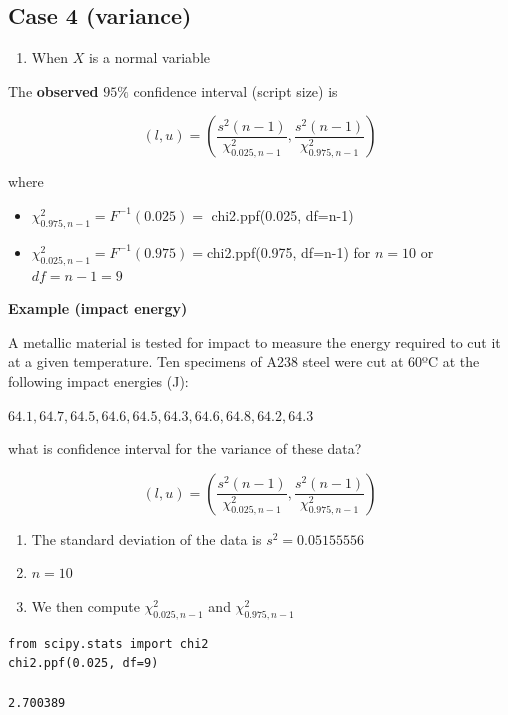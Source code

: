 \documentclass[
]{book}
\providecommand{\tightlist}{%
  \setlength{\itemsep}{0pt}\setlength{\parskip}{0pt}}
\begin{document}
\hypertarget{case-4-variance}{%
\subsection{Case 4 (variance)}\label{case-4-variance}}

\begin{enumerate}
\def\labelenumi{\arabic{enumi}.}
\tightlist
\item
  When \(X\) is a normal variable
\end{enumerate}

The \textbf{observed} \(95\%\) confidence interval (script size) is

\[(l,u) = (\frac{s^2 (n-1)}{\chi^2_{0.025,n-1}},\frac{s^2(n-1)}{\chi^2_{0.975,n-1}})\]

where

\begin{itemize}
\item
  \(\chi^2_{0.975,n-1}=F^{-1}(0.025)=\) chi2.ppf(0.025, df=n-1)
\item
  \(\chi^2_{0.025,n-1}=F^{-1}(0.975)=\)chi2.ppf(0.975, df=n-1)
  for \(n=10\) or \(df=n-1=9\)
\end{itemize}

\textbf{Example (impact energy)}

A metallic material is tested for impact to measure the energy required to cut it at a given temperature. Ten specimens of A238 steel were cut at 60ºC at the following impact energies (J):

\(64.1, 64.7, 64.5, 64.6, 64.5, 64.3, 64.6, 64.8, 64.2, 64.3\)

what is confidence interval for the variance of these data?

\[(l,u) = (\frac{s^2 (n-1)}{\chi^2_{0.025,n-1}},\frac{s^2(n-1)}{\chi^2_{0.975,n-1}})\]

\begin{enumerate}
\def\labelenumi{\arabic{enumi}.}
\item
  The standard deviation of the data is \(s^2=0.05155556\)
\item
  \(n=10\)
\item
  We then compute \(\chi^2_{0.025,n-1}\) and \(\chi^2_{0.975,n-1}\)
\end{enumerate}

\begin{verbatim}
from scipy.stats import chi2
chi2.ppf(0.025, df=9)

2.700389
\end{verbatim}
\end{document}
